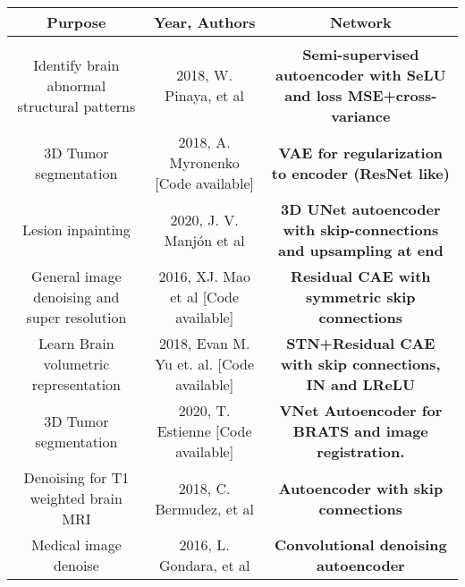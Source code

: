 \begin{table}[!ht]
    \setlength\extrarowheight{2pt} %
    \begin{tabularx}{\textwidth}{C C C}
    \toprule
        \textbf{Purpose} & \textbf{Year, Authors} & \textbf{Network} \\
        \hline
        
        \\
        
        \hline
        
        Identify brain abnormal structural patterns & 2018, W. Pinaya, et al \cite{pinaya2019} & \textbf{Semi-supervised autoencoder with SeLU and loss MSE+cross-variance} \\
        
        3D Tumor segmentation & 2018, A. Myronenko \cite{myronenko20183d} [Code available] & \textbf{VAE for regularization to encoder (ResNet like)} \\
        
         Lesion inpainting & 2020, J. V. Manjón et al \cite{2020inpainting} & \textbf{3D UNet autoencoder with skip-connections and upsampling at end} \\
         
         General image denoising and super resolution & 2016, XJ. Mao et al \cite{superresolution} [Code available] & \textbf{Residual CAE with symmetric skip connections} \\
        
        Learn Brain volumetric representation &  2018, Evan  M.  Yu  et.   al. \cite{learnvolrepreCODE} [Code available] & \textbf{STN+Residual CAE with skip connections, IN and LReLU}\\
        
        3D Tumor segmentation & 2020, T. Estienne \cite{otherBraTS2020} [Code available] & \textbf{VNet Autoencoder for BRATS and image registration.} \\
        
        Denoising for T1 weighted brain MRI & 2018, C. Bermudez, et al \cite{bermudez2018t1autoencoder} & \textbf{Autoencoder with skip connections} \\
        
        Medical image denoise & 2016, L. Gondara, et al \cite{gondara2016medicalautoencoder} &\textbf{Convolutional denoising autoencoder} \\
        

\end{tabularx}
\end{table}
